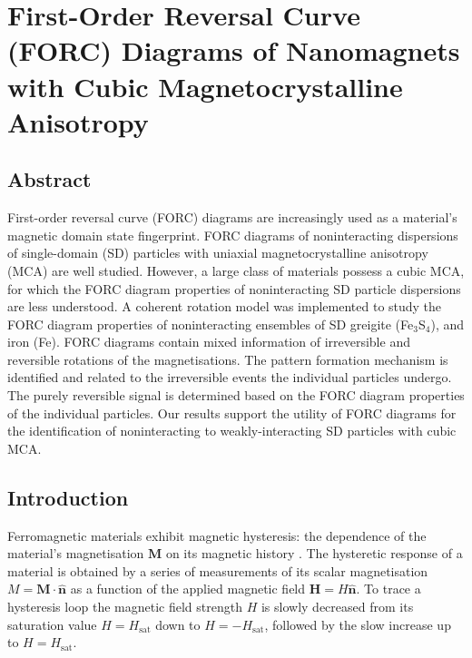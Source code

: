\chapter{First-Order Reversal Curve (FORC) Diagrams of Nanomagnets with Cubic Magnetocrystalline Anisotropy}
\label{ch:res-2}

\section*{Abstract}
First-order reversal curve (FORC) diagrams are increasingly used as a material's magnetic domain state fingerprint. FORC diagrams of noninteracting dispersions of single-domain (SD) particles with uniaxial magnetocrystalline anisotropy (MCA) are well studied. However, a large class of materials possess a cubic MCA, for which the FORC diagram properties of noninteracting SD particle dispersions are less understood. A coherent rotation model was implemented to study the FORC diagram properties of noninteracting ensembles of SD greigite (Fe$_3$S$_4$), and iron (Fe). FORC diagrams contain mixed information of irreversible and reversible rotations of the magnetisations. The pattern formation mechanism is identified and related to the irreversible events the individual particles undergo. The purely reversible signal is determined based on the FORC diagram properties of the individual particles. Our results support the utility of FORC diagrams for the identification of noninteracting to weakly-interacting SD particles with cubic MCA.\par


\section{Introduction}
Ferromagnetic materials exhibit magnetic hysteresis: the dependence of the material's magnetisation $\boldsymbol{M}$ on its magnetic history \citep{Mayergoyz1986}. The hysteretic response of a material is obtained by a series of measurements of its scalar magnetisation $M=\boldsymbol{M} \cdot \boldsymbol{\hat{n}}$ as a function of the applied magnetic field $\boldsymbol{H}=H\boldsymbol{\hat{n}}$. To trace a hysteresis loop the magnetic field strength $H$ is slowly decreased from its saturation value $H=H_{\text{sat}}$ down to $H=-H_{\text{sat}}$, followed by the slow increase up to $H=H_{\text{sat}}$.\par

